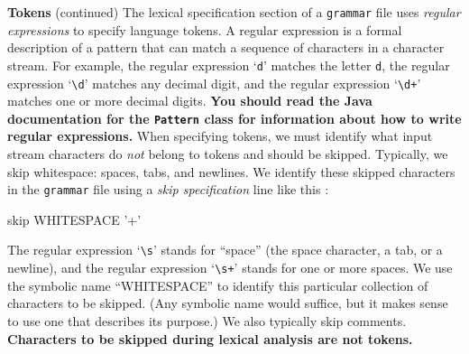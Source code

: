 \begin{minipage}[t]{\sw}
\slidenumber
\LARGE
{\bf Tokens} (continued)\exx
The lexical specification section of a \verb'grammar' file
uses {\em regular expressions} to specify language tokens.
A regular expression is a formal description of a pattern
that can match a sequence of characters in a character stream.
For example, the regular expression `\verb'd'' matches the letter \verb'd',
the regular expression `\verb'\d'' matches any decimal digit,
and the regular expression `\verb'\d+'' matches one or more decimal digits.
{\bf You should read the Java documentation for the \verb'Pattern' class
for information about how to write regular expressions.}\exx
When specifying tokens, we must identify
what input stream characters do {\em not} belong to tokens
and should be skipped.
Typically, we skip whitespace: spaces, tabs, and newlines.
We identify these skipped characters in the \verb'grammar' file
using a {\em skip specification} line like this :
\begin{qv}
skip WHITESPACE '\s+'
\end{qv}
The regular expression `\verb'\s'' stands for ``space''
(the space character, a tab, or a newline),
and the regular expression `\verb'\s+'' stands for one or more spaces.
We use the symbolic name ``WHITESPACE''
to identify this particular collection of characters to be skipped.
(Any symbolic name would suffice,
but it makes sense to use one that describes its purpose.)
We also typically skip comments.\exx
{\bf Characters to be skipped during lexical analysis are not tokens.}
\end{minipage}
\clearpage
